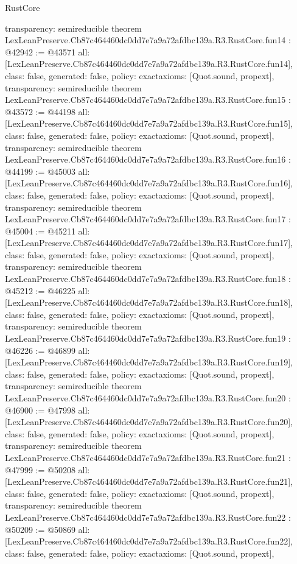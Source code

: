 \begin{lexlean}{RustCore}
\begin{coremodule}
{  transparency: semireducible
}
theorem LexLeanPreserve.Cb87c464460dc0dd7e7a9a72afdbc139a.R3.RustCore.fun14 : @42942 := @43571 {
  all: [LexLeanPreserve.Cb87c464460dc0dd7e7a9a72afdbc139a.R3.RustCore.fun14],
  class: false,
  generated: false,
  policy: exact{axioms: [Quot.sound, propext]},
  transparency: semireducible
}
theorem LexLeanPreserve.Cb87c464460dc0dd7e7a9a72afdbc139a.R3.RustCore.fun15 : @43572 := @44198 {
  all: [LexLeanPreserve.Cb87c464460dc0dd7e7a9a72afdbc139a.R3.RustCore.fun15],
  class: false,
  generated: false,
  policy: exact{axioms: [Quot.sound, propext]},
  transparency: semireducible
}
theorem LexLeanPreserve.Cb87c464460dc0dd7e7a9a72afdbc139a.R3.RustCore.fun16 : @44199 := @45003 {
  all: [LexLeanPreserve.Cb87c464460dc0dd7e7a9a72afdbc139a.R3.RustCore.fun16],
  class: false,
  generated: false,
  policy: exact{axioms: [Quot.sound, propext]},
  transparency: semireducible
}
theorem LexLeanPreserve.Cb87c464460dc0dd7e7a9a72afdbc139a.R3.RustCore.fun17 : @45004 := @45211 {
  all: [LexLeanPreserve.Cb87c464460dc0dd7e7a9a72afdbc139a.R3.RustCore.fun17],
  class: false,
  generated: false,
  policy: exact{axioms: [Quot.sound, propext]},
  transparency: semireducible
}
theorem LexLeanPreserve.Cb87c464460dc0dd7e7a9a72afdbc139a.R3.RustCore.fun18 : @45212 := @46225 {
  all: [LexLeanPreserve.Cb87c464460dc0dd7e7a9a72afdbc139a.R3.RustCore.fun18],
  class: false,
  generated: false,
  policy: exact{axioms: [Quot.sound, propext]},
  transparency: semireducible
}
theorem LexLeanPreserve.Cb87c464460dc0dd7e7a9a72afdbc139a.R3.RustCore.fun19 : @46226 := @46899 {
  all: [LexLeanPreserve.Cb87c464460dc0dd7e7a9a72afdbc139a.R3.RustCore.fun19],
  class: false,
  generated: false,
  policy: exact{axioms: [Quot.sound, propext]},
  transparency: semireducible
}
theorem LexLeanPreserve.Cb87c464460dc0dd7e7a9a72afdbc139a.R3.RustCore.fun20 : @46900 := @47998 {
  all: [LexLeanPreserve.Cb87c464460dc0dd7e7a9a72afdbc139a.R3.RustCore.fun20],
  class: false,
  generated: false,
  policy: exact{axioms: [Quot.sound, propext]},
  transparency: semireducible
}
theorem LexLeanPreserve.Cb87c464460dc0dd7e7a9a72afdbc139a.R3.RustCore.fun21 : @47999 := @50208 {
  all: [LexLeanPreserve.Cb87c464460dc0dd7e7a9a72afdbc139a.R3.RustCore.fun21],
  class: false,
  generated: false,
  policy: exact{axioms: [Quot.sound, propext]},
  transparency: semireducible
}
theorem LexLeanPreserve.Cb87c464460dc0dd7e7a9a72afdbc139a.R3.RustCore.fun22 : @50209 := @50869 {
  all: [LexLeanPreserve.Cb87c464460dc0dd7e7a9a72afdbc139a.R3.RustCore.fun22],
  class: false,
  generated: false,
  policy: exact{axioms: [Quot.sound, propext]},
}
\end{coremodule}
\end{lexlean}
